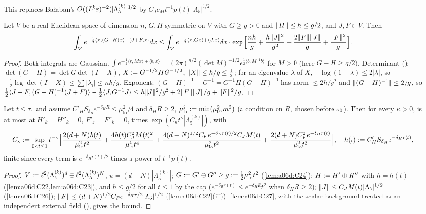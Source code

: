 This replaces Ba{\l}aban's $O((L^k\varepsilon)^{-2})|\Lambda^{(k)}_5|^{1/2}$ \cite[p.~587]{Ba2} by $C_Jc_Mt^{-1}p(t)|\Lambda_5|^{1/2}$.

\begin{lemma}\label{lem:a06d:C27}
Let $V$ be a real Euclidean space of dimension $n$, $G,H$ symmetric on $V$ with $G\ge g>0$ and $\lVert H\rVert\le h\le g/2$, and $J,F\in V$. Then
\[
\int_Ve^{-\frac12\langle x,(G-H)x\rangle+\langle J+F,x\rangle}dx\le\int_Ve^{-\frac12\langle x,Gx\rangle+\langle J,x\rangle}dx\cdot\exp\Big[\frac{nh}g+\frac{h\lVert J\rVert^2}{g^2}+\frac{2\lVert F\rVert\lVert J\rVert}g+\frac{\lVert F\rVert^2}g\Big].
\]
\end{lemma}

\begin{proof}
Both integrals are Gaussian, $\int e^{-\frac12\langle x,Mx\rangle+\langle b,x\rangle}=(2\pi)^{n/2}(\det M)^{-1/2}e^{\frac12\langle b,M^{-1}b\rangle}$ for $M>0$ (here $G-H\ge g/2$). Determinant (\cite[(3.18)--(3.20)]{Ba2}): $\det(G-H)=\det G\det(I-X)$, $X:= G^{-1/2}HG^{-1/2}$, $\lVert X\rVert\le h/g\le\frac12$; for an eigenvalue $\lambda$ of $X$, $-\log(1-\lambda)\le2|\lambda|$, so $-\frac12\log\det(I-X)\le\sum|\lambda_i|\le nh/g$. Exponent: $(G-H)^{-1}-G^{-1}=G^{-1}H(G-H)^{-1}$ has norm $\le2h/g^2$ and $\lVert (G-H)^{-1}\rVert\le2/g$, so $\frac12\langle J+F,(G-H)^{-1}(J+F)\rangle-\frac12\langle J,G^{-1}J\rangle\le h\lVert J\rVert^2/g^2+2\lVert F\rVert\lVert J\rVert/g+\lVert F\rVert^2/g$.
\end{proof}

\begin{corollary}\label{cor:a06d:C28}
Let $t\le\tau_1$ and assume $C'_HS_{\delta_H}e^{-\delta_HR}\le\mu_{\mathrm{lo}}^2/4$ and $\delta_HR\ge2$, $\mu_{\mathrm{lo}}^2:=\min(\mu_0^2,m^2)$ (a condition on $R$, chosen before $\varepsilon_0$). Then for every $\kappa>0$, \cite[(3.9)]{Ba2} is at most \cite[(3.9)]{Ba2} at $H'_k=H''_k=0$, $F'_k=F''_k=0$, times $\exp(C_{\kappa}t^\kappa|\Lambda^{(k)}_5|)$, with
\[
C_\kappa:=\sup_{0<t\le1}t^{-\kappa}\Big[\frac{2(d+N)h(t)}{\mu_{\mathrm{lo}}^2t^2}+\frac{4h(t)C_J^2M(t)^2}{\mu_{\mathrm{lo}}^4t^4}+\frac{4(d+N)^{1/2}C_Fe^{-\delta_Hr(t)/2}C_JM(t)}{\mu_{\mathrm{lo}}^2t^2}+\frac{2(d+N)C_F^2e^{-\delta_Hr(t)}}{\mu_{\mathrm{lo}}^2t^2}\Big],\quad h(t):= C'_HS_{\delta_H}e^{-\delta_Hr(t)},
\]
finite since every term is $e^{-\delta_Hr(t)/2}$ times a power of $t^{-1}p(t)$.
\end{corollary}

\begin{proof}
$V:=\ell^2(\Lambda^{(k)}_5)^d\oplus\ell^2(\Lambda^{(k)}_5)^N$, $n=(d+N)|\Lambda^{(k)}_5|$; $G:= G'\oplus G''\ge g:=\frac12\mu_{\mathrm{lo}}^2t^2$ (\cref{lem:a06d:C24}); $H:= H'\oplus H''$ with $h=h(t)$ (\cref{lem:a06d:C22,lem:a06d:C23}), and $h\le g/2$ for all $t\le1$ by the cap ($e^{-\delta_Hr(t)}\le e^{-\delta_HR}t^2$ when $\delta_HR\ge2$); $\lVert J\rVert\le C_JM(t)|\Lambda_5|^{1/2}$ (\cref{lem:a06d:C26}); $\lVert F\rVert\le(d+N)^{1/2}C_Fe^{-\delta_Hr/2}|\Lambda_5|^{1/2}$ (\cref{lem:a06d:C22}(iii)). \cref{lem:a06d:C27}, with the scalar background treated as an independent external field (\cite[p.~568]{Ba2}), gives the bound.
\end{proof}

